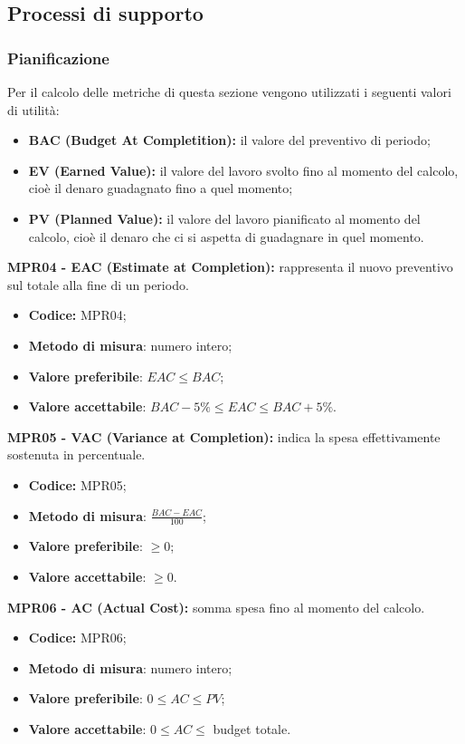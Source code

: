 \subsection{Processi di supporto}
\subsubsection{Pianificazione}
Per il calcolo delle metriche di questa sezione vengono utilizzati i seguenti valori di utilità:
\begin{itemize}
    \item \textbf{BAC (Budget At Completition):} il valore del preventivo di periodo;
    \item \textbf{EV (Earned Value):}  il valore del lavoro svolto fino al momento del calcolo, cioè il denaro guadagnato fino a quel momento;
    \item \textbf{PV (Planned Value):} il valore del lavoro pianificato al momento del calcolo, cioè il denaro che ci si aspetta di guadagnare in quel momento.
\end{itemize}
\textbf{MPR04 - EAC (Estimate at Completion):} rappresenta il nuovo preventivo sul totale alla fine di un periodo.
\begin{itemize}
    \item \textbf{Codice:} MPR04;
    \item \textbf{Metodo di misura}: numero intero;
    \item \textbf{Valore preferibile}: $EAC \leq BAC$;
    \item \textbf{Valore accettabile}: $BAC -5\% \leq EAC \leq BAC +5\%.$
\end{itemize}
\textbf{MPR05 - VAC (Variance at Completion):} indica la spesa effettivamente sostenuta in percentuale.
\begin{itemize}
    \item \textbf{Codice:} MPR05;
    \item \textbf{Metodo di misura}: $\frac{BAC - EAC}{100}$;
    \item \textbf{Valore preferibile}: $\geq 0$;
    \item \textbf{Valore accettabile}: $\geq 0$.
\end{itemize}
\textbf{MPR06 - AC (Actual Cost):} somma spesa fino al momento del calcolo.
\begin{itemize}
    \item \textbf{Codice:} MPR06;
    \item \textbf{Metodo di misura}: numero intero;
    \item \textbf{Valore preferibile}: $0 \leq AC \leq PV$;
    \item \textbf{Valore accettabile}: $0 \leq AC \leq$ budget totale.
\end{itemize}
